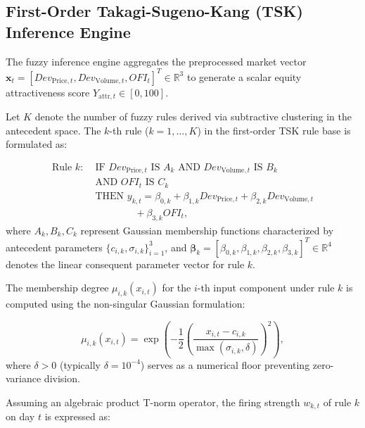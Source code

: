 \documentclass[pdflatex,sn-mathphys-num]{sn-jnl}
\theoremstyle{thmstyleone}
\theoremstyle{thmstyletwo}
\theoremstyle{thmstylethree}
\begin{document}
\subsection{First-Order Takagi-Sugeno-Kang (TSK) Inference Engine}\label{subsec3_2}

The fuzzy inference engine aggregates the preprocessed market vector $\mathbf{x}_t = [Dev_{\mathrm{Price},t}, Dev_{\mathrm{Volume},t}, OFI_t]^T \in \mathbb{R}^3$ to generate a scalar equity attractiveness score $Y_{\mathrm{attr},t} \in [0, 100]$.

Let $K$ denote the number of fuzzy rules derived via subtractive clustering in the antecedent space. The $k$-th rule ($k = 1, \dots, K$) in the first-order TSK rule base is formulated as:

\begin{equation}
    \begin{aligned}
    \text{Rule } k: \;& \text{IF } Dev_{\mathrm{Price},t} \text{ IS } A_k \text{ AND } Dev_{\mathrm{Volume},t} \text{ IS } B_k \\
    & \text{AND } OFI_t \text{ IS } C_k \\
    & \text{THEN } y_{k,t} = \beta_{0,k} + \beta_{1,k} Dev_{\mathrm{Price},t} + \beta_{2,k} Dev_{\mathrm{Volume},t} \\
    & \qquad\qquad + \beta_{3,k} OFI_t,
    \end{aligned}
    \label{eq:tsk_rule}
\end{equation}
where $A_k, B_k, C_k$ represent Gaussian membership functions characterized by antecedent parameters $\{c_{i,k}, \sigma_{i,k}\}_{i=1}^3$, and $\boldsymbol{\beta}_k = [\beta_{0,k}, \beta_{1,k}, \beta_{2,k}, \beta_{3,k}]^T \in \mathbb{R}^4$ denotes the linear consequent parameter vector for rule $k$.

The membership degree $\mu_{i,k}(x_{i,t})$ for the $i$-th input component under rule $k$ is computed using the non-singular Gaussian formulation:

\begin{equation}
    \mu_{i,k}(x_{i,t}) = \exp \left( -\frac{1}{2} \left( \frac{x_{i,t} - c_{i,k}}{\max(\sigma_{i,k}, \delta)} \right)^2 \right),
    \label{eq:gauss_mf}
\end{equation}
where $\delta > 0$ (typically $\delta = 10^{-4}$) serves as a numerical floor preventing zero-variance division.

Assuming an algebraic product T-norm operator, the firing strength $w_{k,t}$ of rule $k$ on day $t$ is expressed as:
\end{document}
